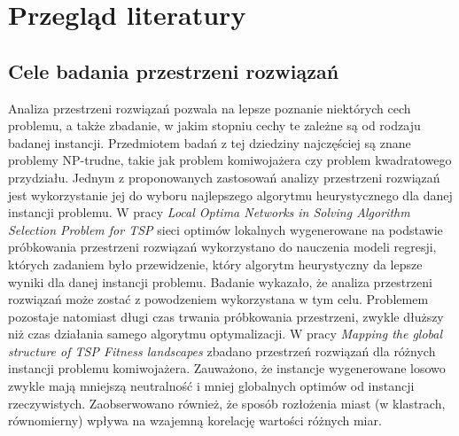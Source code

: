 \chapter{Przegląd literatury}

\section{Cele badania przestrzeni rozwiązań}
Analiza przestrzeni rozwiązań pozwala na lepsze poznanie niektórych cech problemu, a także zbadanie, w jakim stopniu cechy te zależne są od
rodzaju badanej instancji. Przedmiotem badań z tej dziedziny najczęściej są znane problemy NP-trudne, takie jak problem komiwojażera czy problem kwadratowego przydziału.
Jednym z proponowanych zastosowań analizy przestrzeni rozwiązań jest wykorzystanie jej do wyboru najlepszego algorytmu heurystycznego
dla danej instancji problemu. W pracy \textit{Local Optima Networks in Solving Algorithm Selection Problem for TSP} \cite{DBLP:conf/depcos/BozejkoGNAB18}
sieci optimów lokalnych wygenerowane na podstawie próbkowania przestrzeni rozwiązań wykorzystano do nauczenia modeli regresji, których zadaniem było
przewidzenie, który algorytm heurystyczny da lepsze wyniki dla danej instancji problemu.
Badanie wykazało, że analiza przestrzeni rozwiązań może zostać z powodzeniem wykorzystana w tym celu.
Problemem pozostaje natomiast długi czas trwania próbkowania przestrzeni, zwykle dłuższy niż czas działania samego algorytmu optymalizacji.
W pracy \textit{Mapping the global structure of TSP Fitness landscapes} \cite{DBLP:journals/heuristics/OchoaV18} zbadano przestrzeń rozwiązań
dla różnych instancji problemu komiwojażera. Zauważono, że instancje wygenerowane losowo zwykle mają mniejszą neutralność i mniej globalnych optimów od
instancji rzeczywistych. Zaobserwowano również, że sposób rozłożenia miast (w klastrach, równomierny) wpływa na wzajemną korelację wartości różnych miar.

